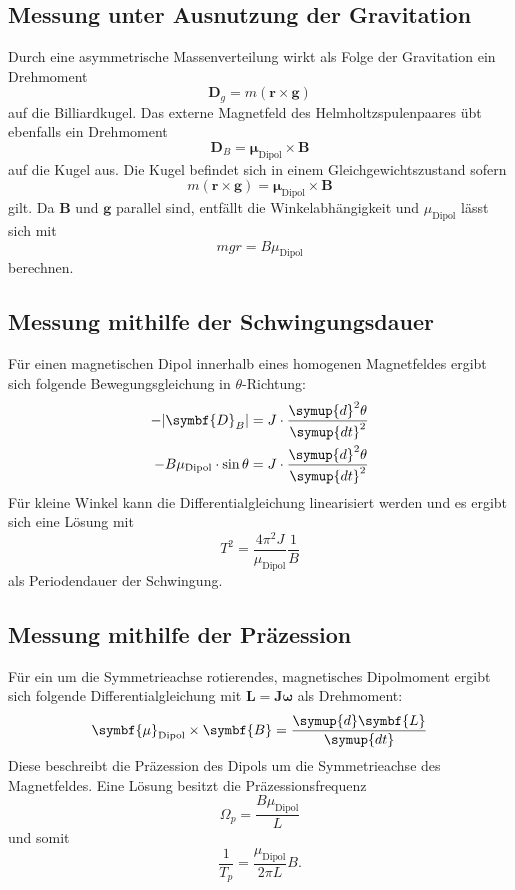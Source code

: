 \subsection{Messung unter Ausnutzung der Gravitation}
Durch eine asymmetrische Massenverteilung wirkt als Folge der Gravitation ein Drehmoment
\begin{equation}
  \symbf{D}_g = m (\symbf{r} \times \symbf{g})
\end{equation}
auf die Billiardkugel.
Das externe Magnetfeld des Helmholtzspulenpaares übt ebenfalls ein Drehmoment
\begin{equation}
  \symbf{D}_B = \symbf{\mu}_\text{Dipol} \times \symbf{B}
\end{equation}
auf die Kugel aus.
Die Kugel befindet sich in einem Gleichgewichtszustand sofern
\begin{equation}
    m (\symbf{r} \times \symbf{g}) = \symbf{\mu}_\text{Dipol} \times \symbf{B}
\end{equation}
gilt.
Da $\symbf{B}$ und $\symbf{g}$ parallel sind, entfällt die Winkelabhängigkeit und $\mu_\text{Dipol}$ lässt sich mit
\begin{equation}
    \label{eq:grav_dip}
    mgr = B\mu_\text{Dipol}
\end{equation}
berechnen.
%
\subsection{Messung mithilfe der Schwingungsdauer}
Für einen magnetischen Dipol innerhalb eines homogenen Magnetfeldes ergibt sich folgende Bewegungsgleichung in
$\theta$-Richtung:
\begin{align}
    -\lvert\symbf{D}_B\rvert &= J \cdot \frac{\symup{d}^2\theta}{\symup{dt}^2} \notag \\
    -B\mu_\text{Dipol}\cdot \sin{\theta} &= J \cdot \frac{\symup{d}^2\theta}{\symup{dt}^2}
\end{align}
Für kleine Winkel kann die Differentialgleichung linearisiert werden und es ergibt sich eine Lösung mit
\begin{equation}
  \label{eq:schwing}
    T^2 = \frac{4\pi^2J}{\mu_\text{Dipol}}\frac{1}{B}
\end{equation}
als Periodendauer der Schwingung.
%
\subsection{Messung mithilfe der Präzession}
Für ein um die Symmetrieachse rotierendes, magnetisches Dipolmoment ergibt sich folgende Differentialgleichung mit
\mbox{$\symbf{L}=\symbf{J\omega}$} als Drehmoment:
\begin{equation}
    \symbf{\mu}_\text{Dipol} \times \symbf{B} = \frac{\symup{d}\symbf{L}}{\symup{dt}}
\end{equation}
Diese beschreibt die Präzession des Dipols um die Symmetrieachse des Magnetfeldes.
Eine Lösung besitzt die Präzessionsfrequenz
\begin{equation}
    \Omega_p = \frac{B\mu_\text{Dipol}}{L}
\end{equation}
und somit
\begin{equation}
  \label{eq:praez}
    \frac{1}{T_p} = \frac{\mu_\text{Dipol}}{2\pi L}B .
\end{equation}

